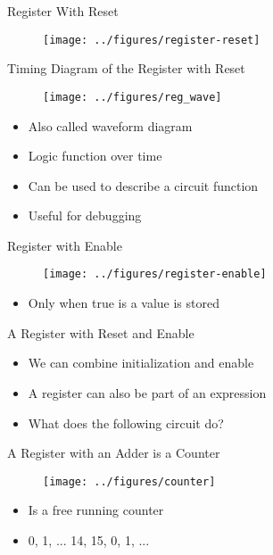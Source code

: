 \begin{frame}[fragile]{Register With Reset}
\begin{figure}
  \texttt{[image: ../figures/register-reset]}
\end{figure}
\end{frame}

\begin{frame}[fragile]{Timing Diagram of the Register with Reset}
\begin{figure}
  \texttt{[image: ../figures/reg\_wave]}
\end{figure}
\begin{itemize}
\item Also called waveform diagram
\item Logic function over time
\item Can be used to describe a circuit function
\item Useful for debugging
\end{itemize}
\end{frame}

\begin{frame}[fragile]{Register with Enable}
\begin{figure}
  \texttt{[image: ../figures/register-enable]}
\end{figure}
\begin{itemize}
\item Only when  true is a value is stored
\end{itemize}

\end{frame}

\begin{frame}[fragile]{A Register with Reset and Enable}
\begin{itemize}
\item We can combine initialization and enable
\end{itemize}
\begin{itemize}
\item A register can also be part of an expression
\item What does the following circuit do?
\end{itemize}
\end{frame}


\begin{frame}[fragile]{A Register with an Adder is a Counter}
\begin{figure}
  \texttt{[image: ../figures/counter]}
\end{figure}
\begin{itemize}
\item Is a free running counter
\item 0, 1, ... 14, 15, 0, 1, ...
\end{itemize}
\end{frame}


